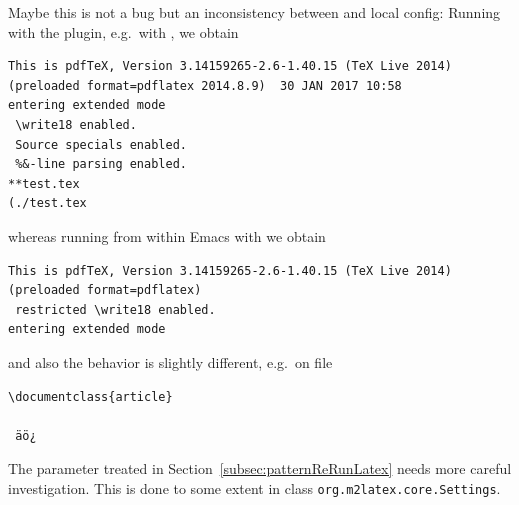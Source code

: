Maybe this is not a bug 
but an inconsistency between \auctex{} and local config: 
Running with the plugin, e.g.~with \pdflatex, we obtain 
%
\begin{Verbatim}[fontsize=\tiny]
This is pdfTeX, Version 3.14159265-2.6-1.40.15 (TeX Live 2014) (preloaded format=pdflatex 2014.8.9)  30 JAN 2017 10:58
entering extended mode
 \write18 enabled.
 Source specials enabled.
 %&-line parsing enabled.
**test.tex
(./test.tex
\end{Verbatim}
%
whereas running from within Emacs with \auctex{} we obtain 
%
\begin{Verbatim}[fontsize=\tiny]
This is pdfTeX, Version 3.14159265-2.6-1.40.15 (TeX Live 2014) (preloaded format=pdflatex)
 restricted \write18 enabled.
entering extended mode
\end{Verbatim}
%
and also the behavior is slightly different, 
e.g.~on file 
\begin{verbatim}
\documentclass{article}

 äö¿

\end{verbatim}

The parameter  
treated in Section~\ref{subsec:patternReRunLatex} 
needs more careful investigation. 
This is done to some extent in class \texttt{org.m2latex.core.Settings}.  

